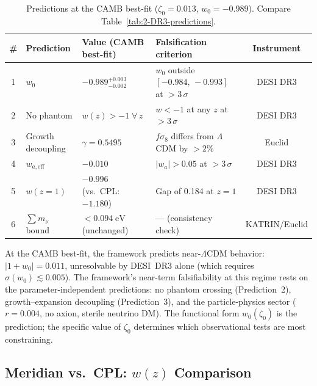 \begin{table}[htbp]
\centering
\caption{Predictions at the CAMB best-fit ($\zeta_0 = 0.013$, $w_0 = -0.989$). Compare Table~\ref{tab:2-DR3-predictions}.}
\label{tab:2-DR3-predictions-CAMB}
\small
\begin{tabular}{@{}clllc@{}}
\toprule
\# & Prediction & Value (CAMB best-fit) & Falsification criterion & Instrument \\
\midrule
1 & $w_0$ & $-0.989^{+0.003}_{-0.002}$ & $w_0$ outside $[-0.984,\, -0.993]$ at $>3\,\sigma$ & DESI DR3 \\[3pt]
2 & No phantom & $w(z) > -1\;\forall\, z$ & $w < -1$ at any $z$ at $>3\,\sigma$ & DESI DR3 \\[3pt]
3 & Growth decoupling & $\gamma = 0.5495$ & $f\sigma_8$ differs from $\Lambda$CDM by $>2\%$ & Euclid \\[3pt]
4 & $w_{a,\mathrm{eff}}$ & $-0.010$ & $|w_a| > 0.05$ at $>3\,\sigma$ & DESI DR3 \\[3pt]
5 & $w(z{=}1)$ & $-0.996$ (vs.\ CPL: $-1.180$) & Gap of 0.184 at $z = 1$ & DESI DR3 \\[3pt]
6 & $\sum m_\nu$ bound & $< 0.094\;\mathrm{eV}$ (unchanged) & --- (consistency check) & KATRIN/Euclid \\
\bottomrule
\end{tabular}
\end{table}

\noindent
At the CAMB best-fit, the framework predicts near-$\Lambda$CDM behavior: $|1 + w_0| = 0.011$, unresolvable by DESI~DR3 alone (which requires $\sigma(w_0) \lesssim 0.005$). The framework's near-term falsifiability at this regime rests on the parameter-independent predictions: no phantom crossing (Prediction~2), growth--expansion decoupling (Prediction~3), and the particle-physics sector ($r = 0.004$, no axion, sterile neutrino DM). The functional form $w_0(\zeta_0)$ is the prediction; the specific value of $\zeta_0$ determines which observational tests are most constraining.

\subsection{Meridian vs.\ CPL: \texorpdfstring{$w(z)$}{w(z)} Comparison}
\label{sec:2-DR3-wz}


